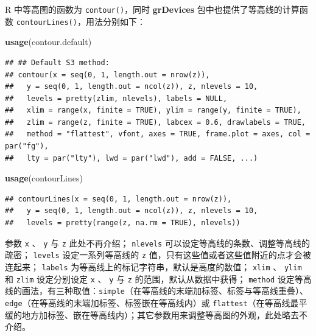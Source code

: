 \documentclass[
  b5paper,
  UTF8,twoside]{book}
\newenvironment{Shaded}{\begin{snugshade}}{\end{snugshade}}
\newcommand{\FunctionTok}[1]{\textcolor[rgb]{0.13,0.29,0.53}{\textbf{#1}}}
\newcommand{\NormalTok}[1]{#1}
\begin{document}
R 中等高图的函数为 \texttt{contour()}，同时 \textbf{grDevices} 包中也提供了等高线的计算函数 \texttt{contourLines()}，用法分别如下：

\begin{Shaded}
\begin{Highlighting}[]
\FunctionTok{usage}\NormalTok{(contour.default)}
\end{Highlighting}
\end{Shaded}

\begin{verbatim}
## ## Default S3 method:
## contour(x = seq(0, 1, length.out = nrow(z)),
##   y = seq(0, 1, length.out = ncol(z)), z, nlevels = 10,
##   levels = pretty(zlim, nlevels), labels = NULL,
##   xlim = range(x, finite = TRUE), ylim = range(y, finite = TRUE),
##   zlim = range(z, finite = TRUE), labcex = 0.6, drawlabels = TRUE,
##   method = "flattest", vfont, axes = TRUE, frame.plot = axes, col = par("fg"),
##   lty = par("lty"), lwd = par("lwd"), add = FALSE, ...)
\end{verbatim}

\begin{Shaded}
\begin{Highlighting}[]
\FunctionTok{usage}\NormalTok{(contourLines)}
\end{Highlighting}
\end{Shaded}

\begin{verbatim}
## contourLines(x = seq(0, 1, length.out = nrow(z)),
##   y = seq(0, 1, length.out = ncol(z)), z, nlevels = 10,
##   levels = pretty(range(z, na.rm = TRUE), nlevels))
\end{verbatim}

参数 \texttt{x} 、 \texttt{y} 与 \texttt{z} 此处不再介绍； \texttt{nlevels} 可以设定等高线的条数、调整等高线的疏密； \texttt{levels} 设定一系列等高线的 \texttt{z} 值，只有这些值或者这些值附近的点才会被连起来； \texttt{labels} 为等高线上的标记字符串，默认是高度的数值； \texttt{xlim} 、 \texttt{ylim} 和 \texttt{zlim} 设定分别设定 \texttt{x} 、 \texttt{y} 与 \texttt{z} 的范围，默认从数据中获得； \texttt{method} 设定等高线的画法，有三种取值：\texttt{\textquotesingle{}simple\textquotesingle{}}（在等高线的末端加标签、标签与等高线重叠）、\texttt{\textquotesingle{}edge\textquotesingle{}}（在等高线的末端加标签、标签嵌在等高线内）或 \texttt{\textquotesingle{}flattest\textquotesingle{}}（在等高线最平缓的地方加标签、嵌在等高线内）；其它参数用来调整等高图的外观，此处略去不介绍。
\end{document}
